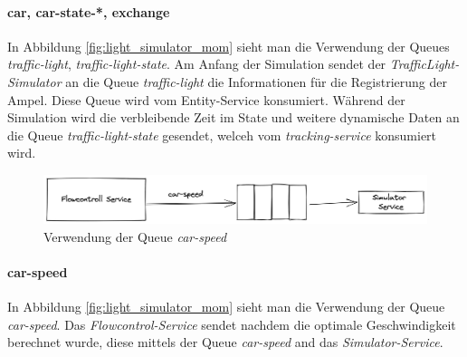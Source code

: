 \paragraph{car, car-state-*, exchange}
In Abbildung \ref{fig:light_simulator_mom} sieht man die Verwendung der Queues \textit{traffic-light}, \textit{traffic-light-state}. Am Anfang der Simulation sendet der \textit{TrafficLight-Simulator} an die Queue \textit{traffic-light} die Informationen für die Registrierung der Ampel. Diese Queue wird vom Entity-Service konsumiert. Während der Simulation wird die verbleibende Zeit im State und weitere dynamische Daten an die Queue \textit{traffic-light-state} gesendet, welceh vom \textit{tracking-service} konsumiert wird.

\begin{figure}[h]
	\centering
	\includegraphics[width=1\textwidth]{./figures/flow_controll_speed_mom.png}
	\caption{Verwendung der Queue \textit{car-speed}}
	\label{fig:car_speed_mom}
\end{figure}

\paragraph{car-speed}
In Abbildung \ref{fig:light_simulator_mom} sieht man die Verwendung der Queue \textit{car-speed}. Das \textit{Flowcontrol-Service} sendet nachdem die optimale Geschwindigkeit berechnet wurde, diese mittels der Queue \textit{car-speed} and das \textit{Simulator-Service}.